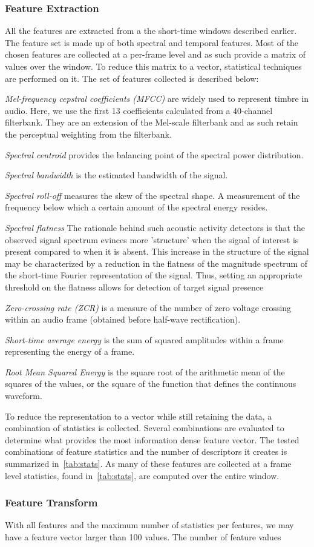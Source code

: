 \subsubsection{Feature Extraction}
All the features are extracted from a the short-time windows described earlier. 
The feature set is made up of both spectral and temporal features. Most of the chosen features are collected at a per-frame level and as such provide a matrix of values over the window. To reduce this matrix to a vector, statistical techniques are performed on it. The set of features collected is described below:

\textit{Mel-frequency cepstral coefficients (MFCC)} are widely used to represent timbre in audio. Here, we use the first 13 coefficients calculated from a 40-channel filterbank. They are an extension of the Mel-scale filterbank and as such retain the perceptual weighting from the filterbank.

\textit{Spectral centroid} provides the balancing point of the spectral power distribution.

\textit{Spectral bandwidth} is the estimated bandwidth of the signal.

\textit{Spectral roll-off} measures the skew of the spectral shape. A measurement of the frequency below which a certain amount of the spectral energy resides.

\textit{Spectral flatness} The rationale
behind such acoustic activity detectors is that the observed signal
spectrum evinces more 'structure' when the signal of interest is
present compared to when it is absent. This increase in the structure
of the signal may be characterized by a reduction in the flatness of
the magnitude spectrum of the short-time Fourier representation of the
signal. Thus, setting an appropriate threshold on the flatness allows
for detection of target signal presence


\textit{Zero-crossing rate (ZCR)} is a measure of the number of zero voltage crossing within an audio frame (obtained before half-wave rectification).

\textit{Short-time average energy} is the sum of squared amplitudes within a frame representing the energy of a frame.

\textit{Root Mean Squared Energy} is the square root of the arithmetic mean of the squares of the values, or the square of the function that defines the continuous waveform.

To reduce the representation to a vector while still retaining the data, a
combination of statistics is collected. Several combinations are evaluated to determine what provides the most information dense feature vector. The tested combinations of feature statistics and the number of descriptors it creates is summarized in~\cref{tab:stats}.
As many of these features are collected at a frame level statistics, found
in~\cref{tab:stats}, are computed over the entire window.

\subsubsection{Feature Transform}
With all features and the maximum number of statistics per features, we may have a feature vector larger than 100 values. The number of feature values
